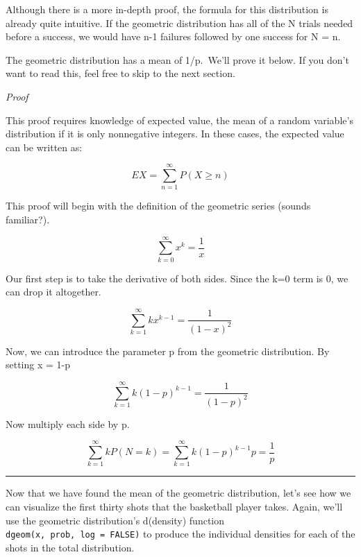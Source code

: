 \documentclass[
]{book}
\begin{document}
Although there is a more in-depth proof, the formula for this distribution is already quite intuitive. If the geometric distribution has all of the N trials needed before a success, we would have n-1 failures followed by one success for N = n.

The geometric distribution has a mean of 1/p.~We'll prove it below. If you don't want to read this, feel free to skip to the next section.

\emph{Proof}

This proof requires knowledge of expected value, the mean of a random variable's distribution if it is only nonnegative integers. In these cases, the expected value can be written as:

\[EX=\sum_{n=1}^{\infty}P(X\geq n)\]

This proof will begin with the definition of the geometric series (sounds familiar?).

\[\sum_{k=0}^{\infty}x^k=\frac{1}{x}\]

Our first step is to take the derivative of both sides. Since the k=0 term is 0, we can drop it altogether.

\[\sum_{k=1}^{\infty}kx^{k-1}=\frac{1}{(1-x)^2}\]

Now, we can introduce the parameter p from the geometric distribution. By setting x = 1-p

\[\sum_{k=1}^{\infty}k(1-p)^{k-1}=\frac{1}{(1-p)^2}\]

Now multiply each side by p.

\[\sum_{k=1}^{\infty}kP(N=k)=\sum_{k=1}^{\infty}k(1-p)^{k-1}p=\frac{1}{p}\]

\begin{center}\rule{0.5\linewidth}{0.5pt}\end{center}

Now that we have found the mean of the geometric distribution, let's see how we can visualize the first thirty shots that the basketball player takes. Again, we'll use the geometric distribution's d(density) function \texttt{dgeom(x,\ prob,\ log\ =\ FALSE)} to produce the individual densities for each of the shots in the total distribution.
\end{document}
